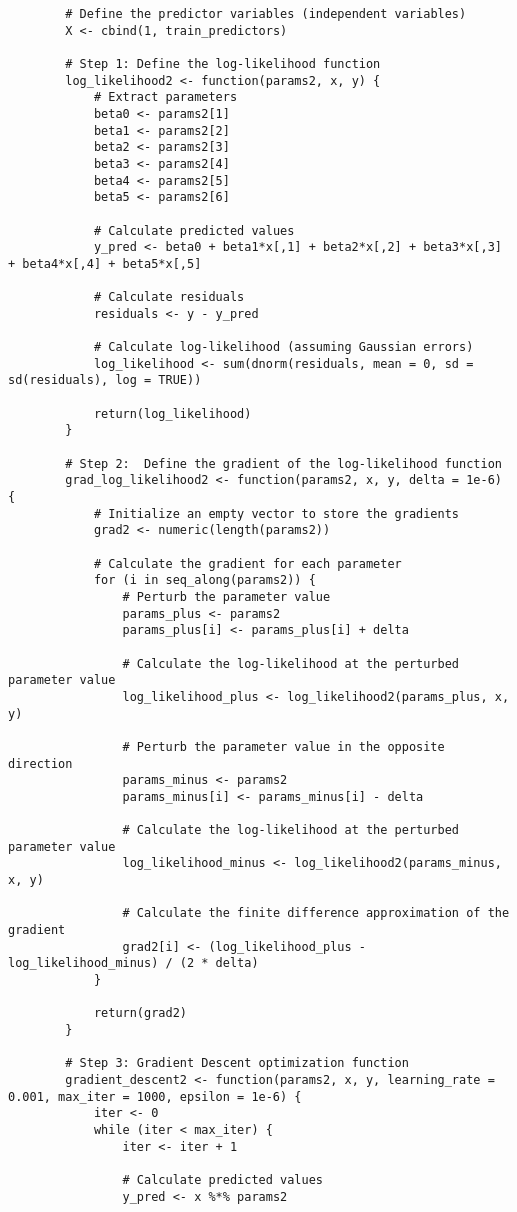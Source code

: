 \documentclass[12pt]{article}
\begin{document}
\begin{lstlisting}
		# Define the predictor variables (independent variables)
		X <- cbind(1, train_predictors)
		
		# Step 1: Define the log-likelihood function
		log_likelihood2 <- function(params2, x, y) {
			# Extract parameters
			beta0 <- params2[1]
			beta1 <- params2[2]
			beta2 <- params2[3]
			beta3 <- params2[4]
			beta4 <- params2[5]
			beta5 <- params2[6]
			
			# Calculate predicted values
			y_pred <- beta0 + beta1*x[,1] + beta2*x[,2] + beta3*x[,3] + beta4*x[,4] + beta5*x[,5]
			
			# Calculate residuals
			residuals <- y - y_pred
			
			# Calculate log-likelihood (assuming Gaussian errors)
			log_likelihood <- sum(dnorm(residuals, mean = 0, sd = sd(residuals), log = TRUE))
			
			return(log_likelihood)
		}
		
		# Step 2:  Define the gradient of the log-likelihood function
		grad_log_likelihood2 <- function(params2, x, y, delta = 1e-6) {
			# Initialize an empty vector to store the gradients
			grad2 <- numeric(length(params2))
			
			# Calculate the gradient for each parameter
			for (i in seq_along(params2)) {
				# Perturb the parameter value
				params_plus <- params2
				params_plus[i] <- params_plus[i] + delta
				
				# Calculate the log-likelihood at the perturbed parameter value
				log_likelihood_plus <- log_likelihood2(params_plus, x, y)
				
				# Perturb the parameter value in the opposite direction
				params_minus <- params2
				params_minus[i] <- params_minus[i] - delta
				
				# Calculate the log-likelihood at the perturbed parameter value
				log_likelihood_minus <- log_likelihood2(params_minus, x, y)
				
				# Calculate the finite difference approximation of the gradient
				grad2[i] <- (log_likelihood_plus - log_likelihood_minus) / (2 * delta)
			}
			
			return(grad2)
		}
		
		# Step 3: Gradient Descent optimization function
		gradient_descent2 <- function(params2, x, y, learning_rate = 0.001, max_iter = 1000, epsilon = 1e-6) {
			iter <- 0
			while (iter < max_iter) {
				iter <- iter + 1
				
				# Calculate predicted values
				y_pred <- x %*% params2
				

\end{lstlisting}
\end{document}
